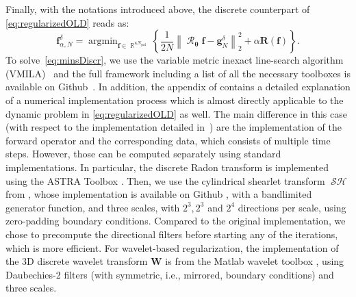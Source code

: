 \documentclass[11pt,a4paper]{article}
\numberwithin{equation}{section}
\DeclareMathOperator{\R}{\mathbb{R}}
\newcommand{\norm}[1]{\left\lVert#1\right\rVert}
\DeclareMathOperator*{\argmin}{argmin}
\DeclareMathOperator{\RadonD}{\vec{\mathcal{R}}}
\newcommand{\Npxl}{N_{\text{pxl}}}
\DeclareMathOperator{\sh}{\mathcal{SH}}
\DeclareMathOperator{\shD}{\vec{\sh}}
\renewcommand{\vec}[1]{\boldsymbol{#1}} %
\newcommand{\f}{\vec{f}} %
\newcommand{\g}{\vec{g}} %
\newcommand{\Wop}{\vec{W}} %
\newcommand{\thetab}{\vec{\theta}} %
\newcommand{\gNd}{{\g_{N}^{\delta}}} %
\newcommand{\faNd}{\f_{\alpha,N}^{\delta}} %
\begin{document}
Finally, with the notations introduced above, the discrete counterpart of \eqref{eq:regularizedOLD} reads as:
\begin{equation}
\faNd = \argmin_{\f \in \R^{\kappa\Npxl}} \left\{ \frac{1}{2N} \norm{ \RadonD_{\thetab} \f -\gNd }_2^2 + \alpha \vec{R}(\f)  \right\}.   
\label{eq:minsDiscr}
\end{equation}
To solve~\eqref{eq:minsDiscr}, we use the variable metric inexact line-search algorithm (VMILA)~\cite{bonettini2016variable} and the full framework including a list of all the necessary toolboxes is available on Github~\cite{randDynTomo}. In addition, the appendix of \cite{Bubba22} contains a detailed explanation of a numerical implementation process which is almost directly applicable to the dynamic problem in \cref{eq:regularizedOLD} as well. 
The main difference in this case (with respect to the implementation detailed in~\cite{Bubba22}) are the implementation of the forward operator and the corresponding data, which consists of multiple time steps. However, those can be computed separately using standard implementations. In particular, the discrete Radon transform is implemented using the ASTRA Toolbox \cite{van2015astraI, van2016astraII}. Then, we use the cylindrical shearlet transform $\shD$ from \cite{Easley21}, whose implementation is available on Github \cite{3dCylShear}, with a bandlimited generator function, and three scales, with $2^3, 2^3$ and $2^4$ directions per scale, using zero-padding boundary conditions. 
Compared to the original implementation, we chose to precompute the directional filters before starting any of the iterations, which is more efficient.
For wavelet-based regularization, the implementation of the 3D discrete wavelet transform $\Wop$ is from the Matlab wavelet toolbox \cite{waveletToolbox}, using Daubechies-2 filters (with symmetric, i.e., mirrored, boundary conditions) and three scales.
\end{document}
